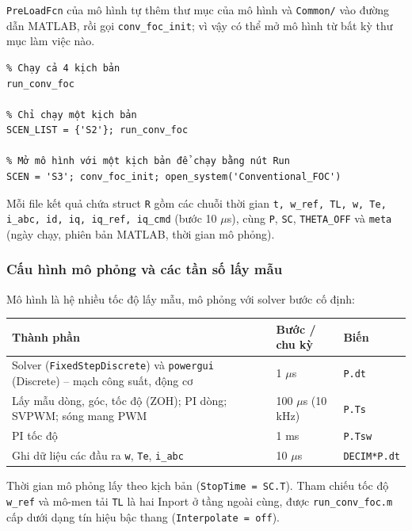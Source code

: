 \texttt{PreLoadFcn} của mô hình tự thêm thư mục của mô hình và \texttt{Common/} vào đường dẫn MATLAB, rồi gọi \texttt{conv\_foc\_init}; vì vậy có thể mở mô hình từ bất kỳ thư mục làm việc nào.

\begin{Verbatim}
% Chạy cả 4 kịch bản
run_conv_foc

% Chỉ chạy một kịch bản
SCEN_LIST = {'S2'}; run_conv_foc

% Mở mô hình với một kịch bản để chạy bằng nút Run
SCEN = 'S3'; conv_foc_init; open_system('Conventional_FOC')
\end{Verbatim}

Mỗi file kết quả chứa struct \texttt{R} gồm các chuỗi thời gian \texttt{t, w\_ref, TL, w, Te, i\_abc, id, iq, iq\_ref, iq\_cmd} (bước 10 $\mu$s), cùng \texttt{P}, \texttt{SC}, \texttt{THETA\_OFF} và \texttt{meta} (ngày chạy, phiên bản MATLAB, thời gian mô phỏng).

\subsubsection{Cấu hình mô phỏng và các tần số lấy mẫu}\label{sec:5.3.2}

Mô hình là hệ nhiều tốc độ lấy mẫu, mô phỏng với solver bước cố định:

\begin{center}\small
\begin{tabularx}{\linewidth}{@{}>{\raggedright\arraybackslash}Xll@{}}
\toprule
Thành phần & Bước / chu kỳ & Biến \\ \midrule
Solver (\texttt{FixedStepDiscrete}) và \texttt{powergui} (Discrete) – mạch công suất, động cơ & 1 $\mu$s & \texttt{P.dt} \\
Lấy mẫu dòng, góc, tốc độ (ZOH); PI dòng; SVPWM; sóng mang PWM & 100 $\mu$s (10 kHz) & \texttt{P.Ts} \\
PI tốc độ & 1 ms & \texttt{P.Tsw} \\
Ghi dữ liệu các đầu ra \texttt{w}, \texttt{Te}, \texttt{i\_abc} & 10 $\mu$s & \texttt{DECIM*P.dt} \\
\bottomrule
\end{tabularx}
\end{center}

Thời gian mô phỏng lấy theo kịch bản (\texttt{StopTime = SC.T}). Tham chiếu tốc độ \texttt{w\_ref} và mô-men tải \texttt{TL} là hai Inport ở tầng ngoài cùng, được \texttt{run\_conv\_foc.m} cấp dưới dạng tín hiệu bậc thang (\texttt{Interpolate = off}).

